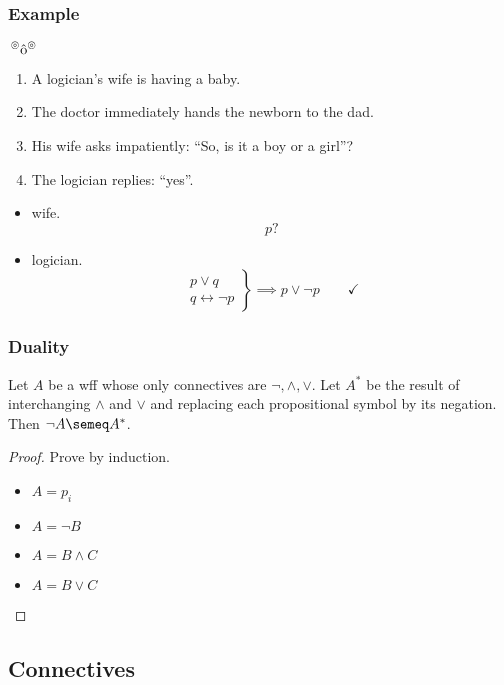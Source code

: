\documentclass[UTF8,11pt,colorlinks,compress,openany]{beamer}%
\begin{document}
\begin{frame}\frametitle{Example}
	\begin{block}{$\sideset{^\circledcirc}{^\circledcirc}{\operatorname{\hat{o}}}$}
		\begin{enumerate}
			\item A logician's wife is having a baby. 
			\item The doctor immediately hands the newborn to the dad.
			\item His wife asks impatiently: ``So, is it a boy or a girl''?
			\item The logician replies: ``yes''.
		\end{enumerate}
	\end{block}
	\begin{itemize}
	\item wife.
	\[p?\]
	\item logician.
	\[\left.\begin{array}{r} p\vee q\\q\leftrightarrow\neg p\end{array}\right\}\implies p\vee\neg p\qquad\checkmark\]
	\end{itemize}
\end{frame}

\begin{frame}\frametitle{Duality}
	\begin{theorem}
		Let $A$ be a wff whose only connectives are $\neg,\wedge,\vee$. Let $A^*$ be the result of interchanging $\wedge$ and $\vee$ and replacing each propositional symbol by its negation. Then $\neg A\semeq A^*$.
	\end{theorem}
	\begin{proof}
		Prove by induction.
		\begin{itemize}
			\item $A=p_i$
			\item $A=\neg B$
			\item $A=B\wedge C$
			\item $A=B\vee C$
		\end{itemize}
	\end{proof}
\end{frame}

\subsection{Connectives}
\end{document}
